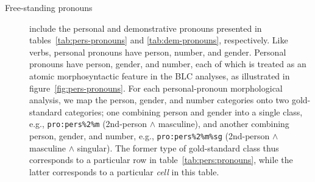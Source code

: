 \begin{description}
			
			

\item[Free-standing pronouns] include the personal and demonstrative pronouns presented in 
tables~\ref{tab:pers-pronouns} and \ref{tab:dem-pronouns}, respectively.
Like verbs, personal pronouns have person, number, and gender. 
Personal pronouns have person, gender, and number, each of which is treated as 
an atomic morphosyntactic feature in the BLC analyses, as illustrated in 
figure~\ref{fig:pers-pronouns}. For each personal-pronoun morphological analysis, 
we map the person, gender, and number categories onto
two gold-standard categories; one combining person and gender 
into a single class, e.g., \texttt{pro:pers\%2\%m} (2nd-person $\land$ masculine), 
and another combining person, gender, and number, 
e.g., \texttt{pro:pers\%2\%m\%sg} (2nd-person $\land$ masculine $\land$ singular). 
The former type of gold-standard class
thus corresponds to a particular row in table~\ref{tab:pers:pronouns}, 
while the latter corresponds to a particular \emph{cell} in this table.


\end{description}
